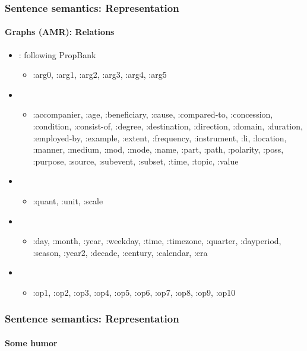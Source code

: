 \documentclass[xcolor=table]{beamer}
\begin{document}
\begin{frame}[fragile]
	\frametitle{Sentence semantics: Representation}
	\framesubtitle{Graphs (AMR): Relations}
	
	\begin{itemize}
		\item {}: following PropBank
		\begin{itemize}
			\item :arg0, :arg1, :arg2, :arg3, :arg4, :arg5
		\end{itemize}
		\item {}
		\begin{itemize}
			\item :accompanier, :age, :beneficiary, :cause, :compared-to, :concession, :condition, :consist-of, :degree, :destination, :direction, :domain, :duration, :employed-by, :example, :extent, :frequency, :instrument, :li, :location, :manner, :medium, :mod, :mode, :name, :part, :path, :polarity, :poss, :purpose, :source, :subevent, :subset, :time, :topic, :value
		\end{itemize}
		\item {}
		\begin{itemize}
			\item :quant, :unit, :scale
		\end{itemize}
		\item {}
		\begin{itemize}
			\item :day, :month,
			:year, :weekday, :time, :timezone, :quarter,
			:dayperiod, :season, :year2, :decade, :century,
			:calendar, :era
		\end{itemize}
		\item {}
		\begin{itemize}
			\item :op1, :op2, :op3, :op4, :op5,
			:op6, :op7, :op8, :op9, :op10
		\end{itemize}
	\end{itemize}
	
\end{frame}

\begin{frame}
	\frametitle{Sentence semantics: Representation}
	\framesubtitle{Some humor}
	
	\begin{center}
	\end{center}
	
\end{frame}

\end{document}

